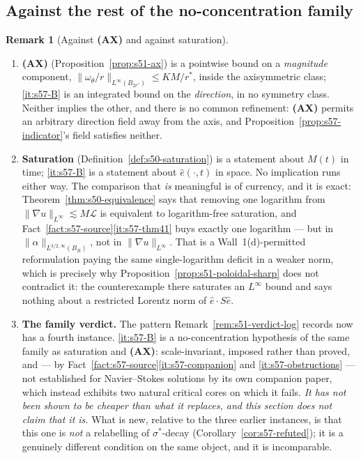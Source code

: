 \documentclass[11pt]{article}
\theoremstyle{definition}
\newtheorem{remark}[theorem]{Remark}
\theoremstyle{remark}
\begin{document}
\subsection{Against the rest of the no-concentration family}
\label{subsec:s57-family}

\begin{remark}[Against \textbf{(AX)} and against saturation]
  \label{rem:s57-family}
  \begin{enumerate}[label=\textup{(\roman*)},leftmargin=2.6em]
  \item \textbf{(AX)} (Proposition~\ref{prop:s51-ax}) is a pointwise bound on
    a \emph{magnitude} component, $\|\omega_\theta/r\|_{L^\infty(B_{2r^*})}
    \leq KM/r^*$, inside the axisymmetric class; \ref{it:s57-B} is an
    integrated bound on the \emph{direction}, in no symmetry class. Neither
    implies the other, and there is no common refinement: \textbf{(AX)}
    permits an arbitrary direction field away from the axis, and
    Proposition~\ref{prop:s57-indicator}'s field satisfies neither.
  \item \textbf{Saturation} (Definition~\ref{def:s50-saturation}) is a
    statement about $M(t)$ in time; \ref{it:s57-B} is a statement about
    $\hat e(\cdot,t)$ in space. No implication runs either way. The
    comparison that \emph{is} meaningful is of currency, and it is exact:
    Theorem~\ref{thm:s50-equivalence} says that removing one logarithm from
    $\|\nabla u\|_{L^\infty}\lesssim M\mathcal{L}$ is equivalent to
    logarithm-free saturation, and
    Fact~\ref{fact:s57-source}\ref{it:s57-thm41} buys exactly one logarithm
    --- but in $\|\alpha\|_{L^{3/2,\infty}(B_R)}$, not in
    $\|\nabla u\|_{L^\infty}$. That is a Wall~1(d)-permitted reformulation
    paying the same single-logarithm deficit in a weaker norm, which is
    precisely why Proposition~\ref{prop:s51-poloidal-sharp} does not
    contradict it: the counterexample there saturates an $L^\infty$ bound and
    says nothing about a restricted Lorentz norm of $\hat e\cdot S\hat e$.
  \item \textbf{The family verdict.} The pattern
    Remark~\ref{rem:s51-verdict-log} records now has a fourth instance.
    \ref{it:s57-B} is a no-concentration hypothesis of the same family as
    saturation and \textbf{(AX)}: scale-invariant, imposed rather than proved,
    and --- by Fact~\ref{fact:s57-source}\ref{it:s57-companion} and
    \ref{it:s57-obstructions} --- not established for Navier--Stokes
    solutions by its own companion paper, which instead exhibits two natural
    critical cores on which it fails. \emph{It has not been shown to be
    cheaper than what it replaces, and this section does not claim that it
    is.} What is new, relative to the three earlier instances, is that this
    one is \emph{not} a relabelling of $\sigma^*$-decay
    (Corollary~\ref{cor:s57-refuted}); it is a genuinely different condition
    on the same object, and it is incomparable.
  \end{enumerate}
\end{remark}
\end{document}

